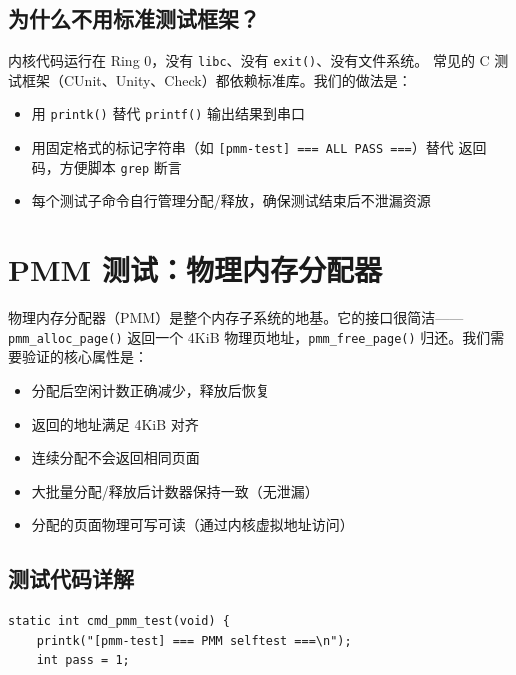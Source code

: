 \subsection{为什么不用标准测试框架？}

内核代码运行在 Ring 0，没有 \texttt{libc}、没有 \texttt{exit()}、没有文件系统。
常见的 C 测试框架（CUnit、Unity、Check）都依赖标准库。我们的做法是：

\begin{itemize}
  \item 用 \texttt{printk()} 替代 \texttt{printf()} 输出结果到串口
  \item 用固定格式的标记字符串（如 \texttt{[pmm-test] === ALL PASS ===}）替代
    返回码，方便脚本 \texttt{grep} 断言
  \item 每个测试子命令自行管理分配/释放，确保测试结束后不泄漏资源
\end{itemize}


\section{PMM 测试：物理内存分配器}
\label{sec:test-pmm}

物理内存分配器（PMM）是整个内存子系统的地基。它的接口很简洁——\texttt{pmm\_alloc\_page()}
返回一个 4KiB 物理页地址，\texttt{pmm\_free\_page()} 归还。我们需要验证的核心属性是：

\begin{itemize}
  \item 分配后空闲计数正确减少，释放后恢复
  \item 返回的地址满足 4KiB 对齐
  \item 连续分配不会返回相同页面
  \item 大批量分配/释放后计数器保持一致（无泄漏）
  \item 分配的页面物理可写可读（通过内核虚拟地址访问）
\end{itemize}

\subsection{测试代码详解}

\begin{lstlisting}[style=cstyle]
static int cmd_pmm_test(void) {
    printk("[pmm-test] === PMM selftest ===\n");
    int pass = 1;
\end{lstlisting}

